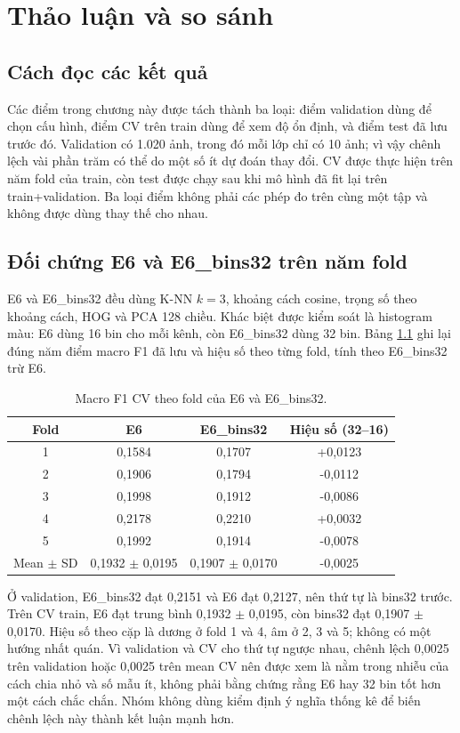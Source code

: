 \chapter{Thảo luận và so sánh}
\section{Cách đọc các kết quả}
Các điểm trong chương này được tách thành ba loại: điểm validation dùng để chọn cấu hình, điểm CV trên train dùng để xem độ ổn định, và điểm test đã lưu trước đó. Validation có 1.020 ảnh, trong đó mỗi lớp chỉ có 10 ảnh; vì vậy chênh lệch vài phần trăm có thể do một số ít dự đoán thay đổi. CV được thực hiện trên năm fold của train, còn test được chạy sau khi mô hình đã fit lại trên train+validation. Ba loại điểm không phải các phép đo trên cùng một tập và không được dùng thay thế cho nhau.

\section{Đối chứng E6 và E6\_bins32 trên năm fold}
E6 và E6\_bins32 đều dùng K-NN $k=3$, khoảng cách cosine, trọng số theo khoảng cách, HOG và PCA 128 chiều. Khác biệt được kiểm soát là histogram màu: E6 dùng 16 bin cho mỗi kênh, còn E6\_bins32 dùng 32 bin. Bảng \ref{tab:e6bins32fold} ghi lại đúng năm điểm macro F1 đã lưu và hiệu số theo từng fold, tính theo E6\_bins32 trừ E6.

\begin{table}[H]\centering\small
\caption{Macro F1 CV theo fold của E6 và E6\_bins32.}\label{tab:e6bins32fold}
\begin{tabular}{c|ccc}
\toprule
Fold & E6 & E6\_bins32 & Hiệu số (32--16)\\
\midrule
1 & 0,1584 & 0,1707 & +0,0123\\
2 & 0,1906 & 0,1794 & -0,0112\\
3 & 0,1998 & 0,1912 & -0,0086\\
4 & 0,2178 & 0,2210 & +0,0032\\
5 & 0,1992 & 0,1914 & -0,0078\\
\midrule
Mean $\pm$ SD & 0,1932 $\pm$ 0,0195 & 0,1907 $\pm$ 0,0170 & -0,0025\\
\bottomrule
\end{tabular}
\end{table}

Ở validation, E6\_bins32 đạt 0,2151 và E6 đạt 0,2127, nên thứ tự là bins32 trước. Trên CV train, E6 đạt trung bình 0,1932 $\pm$ 0,0195, còn bins32 đạt 0,1907 $\pm$ 0,0170. Hiệu số theo cặp là dương ở fold 1 và 4, âm ở 2, 3 và 5; không có một hướng nhất quán. Vì validation và CV cho thứ tự ngược nhau, chênh lệch 0,0025 trên validation hoặc 0,0025 trên mean CV nên được xem là nằm trong nhiễu của cách chia nhỏ và số mẫu ít, không phải bằng chứng rằng E6 hay 32 bin tốt hơn một cách chắc chắn. Nhóm không dùng kiểm định ý nghĩa thống kê để biến chênh lệch này thành kết luận mạnh hơn.

